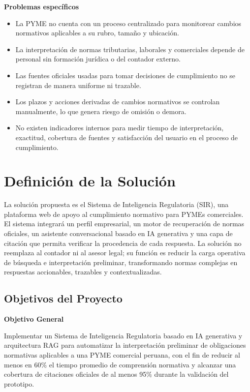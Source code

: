 \documentclass[12pt,a4paper,oneside]{report}
\begin{document}
\textbf{Problemas específicos}

\begin{itemize}
\item La PYME no cuenta con un proceso centralizado para monitorear cambios normativos aplicables a su rubro, tamaño y ubicación.
\item La interpretación de normas tributarias, laborales y comerciales depende de personal sin formación jurídica o del contador externo.
\item Las fuentes oficiales usadas para tomar decisiones de cumplimiento no se registran de manera uniforme ni trazable.
\item Los plazos y acciones derivadas de cambios normativos se controlan manualmente, lo que genera riesgo de omisión o demora.
\item No existen indicadores internos para medir tiempo de interpretación, exactitud, cobertura de fuentes y satisfacción del usuario en el proceso de cumplimiento.
\end{itemize}

\section{Definición de la Solución}\label{sec:definicion-de-la-solucion}

La solución propuesta es el Sistema de Inteligencia Regulatoria (SIR), una plataforma web de apoyo al cumplimiento normativo para PYMEs comerciales. El sistema integrará un perfil empresarial, un motor de recuperación de normas oficiales, un asistente conversacional basado en IA generativa y una capa de citación que permita verificar la procedencia de cada respuesta. La solución no reemplaza al contador ni al asesor legal; su función es reducir la carga operativa de búsqueda e interpretación preliminar, transformando normas complejas en respuestas accionables, trazables y contextualizadas.

\subsection{Objetivos del Proyecto}\label{subsec:objetivos-del-proyecto}

\textbf{Objetivo General}

Implementar un Sistema de Inteligencia Regulatoria basado en IA generativa y arquitectura RAG para automatizar la interpretación preliminar de obligaciones normativas aplicables a una PYME comercial peruana, con el fin de reducir al menos en 60\% el tiempo promedio de comprensión normativa y alcanzar una cobertura de citaciones oficiales de al menos 95\% durante la validación del prototipo.
\end{document}

